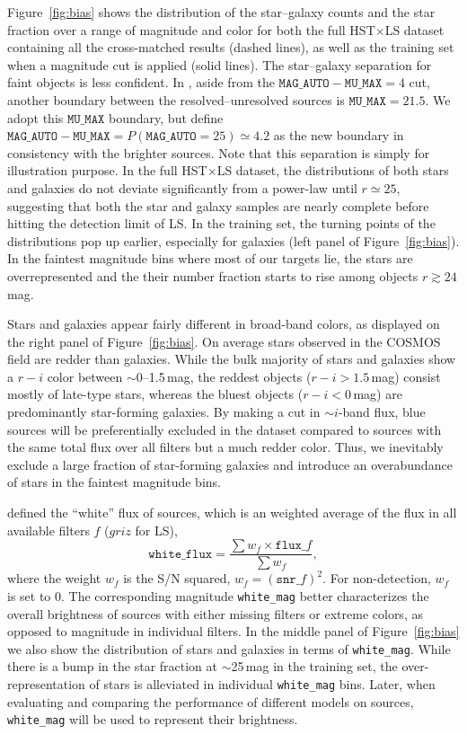 \documentclass[twocolumn]{aastex631}
\newcommand{\magauto}{\texttt{MAG\_AUTO}}
\begin{document}
\begin{CJK*}{UTF8}{gbsn}
Figure~\ref{fig:bias} shows the distribution of the star--galaxy counts and the star fraction over a range of magnitude and color for both the full HST$\times$LS dataset containing all the cross-matched results (dashed lines), as well as the training set when a magnitude cut is applied (solid lines). The star--galaxy separation for faint objects is less confident. In \cite{Leauthaud_2007}, aside from the $\texttt{MAG\_AUTO} - \texttt{MU\_MAX}=4$ cut, another boundary between the resolved--unresolved sources is $\texttt{MU\_MAX} = 21.5$. We adopt this $\texttt{MU\_MAX}$ boundary, but define $\texttt{MAG\_AUTO} - \texttt{MU\_MAX}=P(\magauto=25)\simeq 4.2$ as the new boundary in consistency with the brighter sources. Note that this separation is simply for illustration purpose. In the full HST$\times$LS dataset, the distributions of both stars and galaxies do not deviate significantly from a power-law until $r\simeq25$, suggesting that both the star and galaxy samples are nearly complete before hitting the detection limit of LS. In the training set, the turning points of the distributions pop up earlier, especially for galaxies (left panel of Figure~\ref{fig:bias}). In the faintest magnitude bins where most of our targets lie, the stars are overrepresented and the their number fraction starts to rise among objects $r\gtrsim24$\,mag.

Stars and galaxies appear fairly different in broad-band colors, as displayed on the right panel of Figure~\ref{fig:bias}. On average stars observed in the COSMOS field are redder than galaxies. While the bulk majority of stars and galaxies show a $r-i$ color between $\sim$0--1.5\,mag, the reddest objects ($r-i>1.5$\,mag) consist mostly of late-type stars, whereas the bluest objects ($r-i<0$\,mag) are predominantly star-forming galaxies. By making a cut in $\sim$$i$-band flux, blue sources will be preferentially excluded in the dataset compared to sources with the same total flux over all filters but a much redder color. Thus, we inevitably exclude a large fraction of star-forming galaxies and introduce an overabundance of stars in the faintest magnitude bins. 

 defined the ``white'' flux of sources, which is an weighted average of the flux in all available filters $f$ ($griz$ for LS),
\begin{equation}\label{eq:white_flux}
    \texttt{white\_flux} = \frac{\sum w_f\times \texttt{flux}\_f}{\sum w_f},
\end{equation}
where the weight $w_f$ is the S/N squared, $w_f=(\texttt{snr\_}f)^2$. For non-detection, $w_f$ is set to 0. The corresponding magnitude \texttt{white\_mag} better characterizes the overall brightness of sources with either missing filters or extreme colors, as opposed to magnitude in individual filters. In the middle panel of Figure~\ref{fig:bias} we also show the distribution of stars and galaxies in terms of \texttt{white\_mag}. While there is a bump in the star fraction at $\sim$25\,mag in the training set, the over-representation of stars is alleviated in individual \texttt{white\_mag} bins. Later, when evaluating and comparing the performance of different models on sources, \texttt{white\_mag} will be used to represent their brightness.


\end{CJK*}
\end{document}

